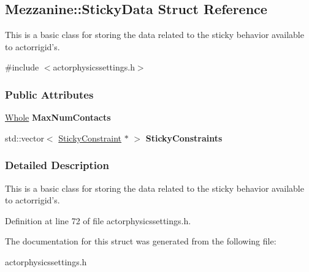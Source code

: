 \hypertarget{structMezzanine_1_1StickyData}{
\subsection{Mezzanine::StickyData Struct Reference}
\label{structMezzanine_1_1StickyData}
}


This is a basic class for storing the data related to the sticky behavior available to actorrigid's.  




{\ttfamily \#include $<$actorphysicssettings.h$>$}

\subsubsection*{Public Attributes}
\begin{DoxyCompactItemize}
\item 
\hypertarget{structMezzanine_1_1StickyData_a187bcd953ed41f4af50562255f633ba5}{
\hyperlink{namespaceMezzanine_adcbb6ce6d1eb4379d109e51171e2e493}{Whole} {\bfseries MaxNumContacts}}
\label{structMezzanine_1_1StickyData_a187bcd953ed41f4af50562255f633ba5}

\item 
\hypertarget{structMezzanine_1_1StickyData_aa1cb4315a53c06374f66d213558a2c56}{
std::vector$<$ \hyperlink{classMezzanine_1_1SliderConstraint}{StickyConstraint} $\ast$ $>$ {\bfseries StickyConstraints}}
\label{structMezzanine_1_1StickyData_aa1cb4315a53c06374f66d213558a2c56}

\end{DoxyCompactItemize}


\subsubsection{Detailed Description}
This is a basic class for storing the data related to the sticky behavior available to actorrigid's. 

Definition at line 72 of file actorphysicssettings.h.



The documentation for this struct was generated from the following file:\begin{DoxyCompactItemize}
\item 
actorphysicssettings.h\end{DoxyCompactItemize}

